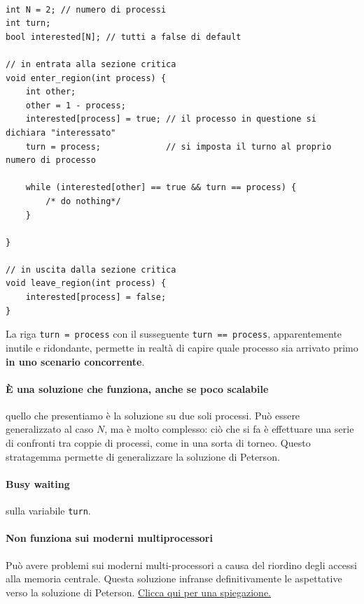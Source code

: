 \documentclass{report}
\begin{document}
\begin{verbatim}

int N = 2; // numero di processi
int turn;
bool interested[N]; // tutti a false di default

// in entrata alla sezione critica
void enter_region(int process) {
    int other; 
    other = 1 - process;        
    interested[process] = true; // il processo in questione si dichiara "interessato"
    turn = process;             // si imposta il turno al proprio numero di processo
    
    while (interested[other] == true && turn == process) {
        /* do nothing*/
    }
    
}

// in uscita dalla sezione critica
void leave_region(int process) {
    interested[process] = false; 
}
\end{verbatim}

La riga \verb|turn = process| con il susseguente \verb|turn == process|, apparentemente inutile e ridondante, permette in realtà di capire quale processo sia arrivato primo \textbf{in uno scenario concorrente}.

\paragraph{È una soluzione che funziona, anche se poco scalabile} quello che presentiamo è la soluzione su due soli processi. Può essere generalizzato al caso $N$, ma è molto complesso: ciò che si fa è effettuare una serie di confronti tra coppie di processi, come in una sorta di torneo. Questo stratagemma permette di generalizzare la soluzione di Peterson.

\paragraph{Busy waiting} sulla variabile \verb*|turn|.

\paragraph{Non funziona sui moderni multiprocessori} Può avere problemi sui moderni multi-processori a causa del riordino degli accessi alla memoria centrale. Questa soluzione infranse definitivamente le aspettative verso la soluzione di Peterson. \href{https://www.quora.com/Why-is-Petersons-solution-not-guaranteed-to-work-on-modern-computer-architecture-as-mentioned-in-Operating-System-Concepts-by-Silberschatz}{Clicca qui per una spiegazione.}
\end{document}
